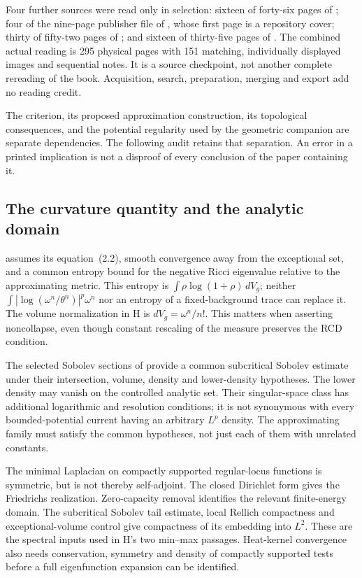 Four further sources were read only in selection:
sixteen of forty-six pages of \cite{FGS25RCDThreefoldV1};
four of the nine-page publisher file of
\cite{Vajaitu01EmbeddablePublished}, whose first page is a
repository cover; thirty of fifty-two pages of
\cite{GPSS23SobolevV1}; and sixteen of thirty-five pages
of \cite{EGZ08SingularKEV2}. The combined actual reading
is 295 physical pages with 151 matching, individually
displayed images and sequential notes. It is a source
checkpoint, not another complete rereading of the book.
Acquisition, search, preparation, merging and export add
no reading credit.

The criterion, its proposed approximation construction, its
topological consequences, and the potential regularity used
by the geometric companion are separate dependencies.
The following audit retains that separation. An error in
a printed implication is not a disproof of every conclusion
of the paper containing it.

\subsection{The curvature quantity and the analytic domain}

\cite[Proposition~5.1]{GSS26RicciEntropyV1} assumes its
equation~(2.2), smooth convergence away from the exceptional
set, and a common entropy bound for the negative Ricci
eigenvalue relative to the approximating metric. This
entropy is \(\int\rho\log(1+\rho)\,dV_g\); neither
\(\int |\log(\omega^n/\theta^n)|^p\omega^n\) nor an
entropy of a fixed-background trace can replace it.
The volume normalization in H is \(dV_g=\omega^n/n!\).
This matters when asserting noncollapse, even though
constant rescaling of the measure preserves the RCD condition.

The selected Sobolev sections of \cite{GPSS23SobolevV1}
provide a common subcritical Sobolev estimate under their
intersection, volume, density and lower-density hypotheses.
The lower density may vanish on the controlled analytic
set. Their singular-space class has additional logarithmic
and resolution conditions; it is not synonymous with every
bounded-potential current having an arbitrary \(L^p\) density.
The approximating family must satisfy the common hypotheses,
not just each of them with unrelated constants.

The minimal Laplacian on compactly supported regular-locus
functions is symmetric, but is not thereby self-adjoint.
The closed Dirichlet form gives the Friedrichs realization.
Zero-capacity removal identifies the relevant finite-energy
domain. The subcritical Sobolev tail estimate, local Rellich
compactness and exceptional-volume control give compactness
of its embedding into \(L^2\). These are the spectral inputs
used in H's two min--max passages. Heat-kernel convergence
also needs conservation, symmetry and density of compactly
supported tests before a full eigenfunction expansion can
be identified.

